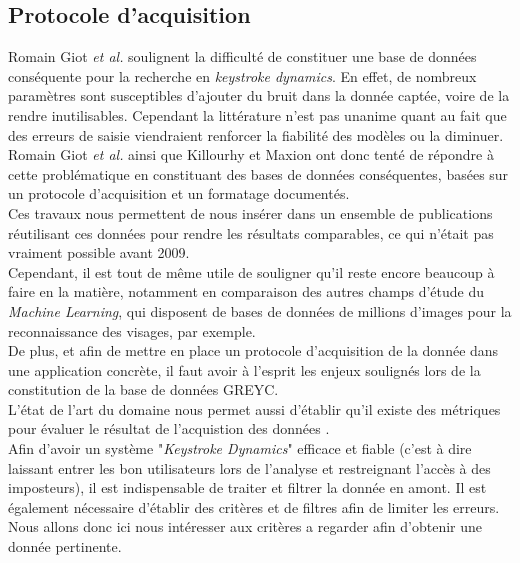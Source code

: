 \subsection{Protocole d'acquisition}

Romain Giot \textit{et al.}\cite{giotGREYC} soulignent la difficulté de constituer une base de données conséquente pour la recherche en \textit{keystroke dynamics}. En effet, de nombreux paramètres sont susceptibles d'ajouter du bruit dans la donnée captée, voire de la rendre inutilisables. Cependant la littérature n'est pas unanime quant au fait que des erreurs de saisie viendraient renforcer la fiabilité des modèles ou la diminuer.\\

Romain Giot \textit{et al.} \cite{giotGREYC} ainsi que Killourhy et Maxion \cite{killourhy2009} ont donc tenté de répondre à cette problématique en constituant des bases de données conséquentes, basées sur un protocole d'acquisition et un formatage documentés.\\

Ces travaux nous permettent de nous insérer dans un ensemble de publications réutilisant ces données pour rendre les résultats comparables, ce qui n'était pas vraiment possible avant 2009.\\

Cependant, il est tout de même utile de souligner qu'il reste encore beaucoup à faire en la matière, notamment en comparaison des autres champs d'étude du \textit{Machine Learning}, qui disposent de bases de données de millions d'images pour la reconnaissance des visages, par exemple.\\

De plus, et afin de mettre en place un protocole d'acquisition de la donnée dans une application concrète, il faut avoir à l'esprit les enjeux soulignés lors de la constitution de la base de données GREYC\cite{giotGREYC}.\\

L'état de l'art du domaine nous permet aussi d'établir qu'il existe des métriques pour évaluer le résultat de l'acquistion des données \cite{giotWeb}.\\

Afin d'avoir un système "\textit{Keystroke Dynamics}" efficace et fiable (c'est à dire laissant entrer les bon utilisateurs lors de l'analyse et restreignant l'accès à des imposteurs), il est indispensable de traiter et filtrer la donnée en amont. Il est également nécessaire d'établir des critères et de filtres afin de  limiter les erreurs. Nous allons donc ici nous intéresser aux critères a regarder afin d'obtenir une donnée pertinente.


